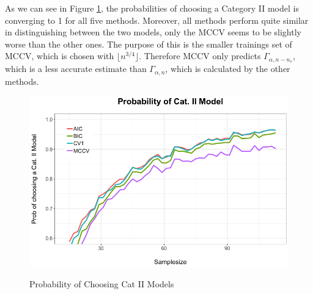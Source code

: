 \documentclass[Research_Module_ES.tex]{subfiles}
\begin{document}
As we can see in Figure \ref{Simulation1}, the probabilities of choosing a Category II model is converging to 1 for all five methods. Moreover, all methods perform quite similar in distinguishing between the two models, only the MCCV seems to be slightly worse than the other ones. The purpose of this is the smaller trainings set of MCCV, which is chosen with $\lfloor n^{3/4}\rfloor$. Therefore MCCV only predicts $\Gamma_{\alpha,n-n_v}$, which is a less accurate estimate than $\Gamma_{\alpha,n}$, which is calculated by the other methods. 
\begin{figure}[!h]
	\label{Simulation1}
	\centering
	\includegraphics[width=1\textwidth]{Simulation1.png}\\
\caption{Probability of Choosing Cat II Models}
\end{figure}
\end{document}
